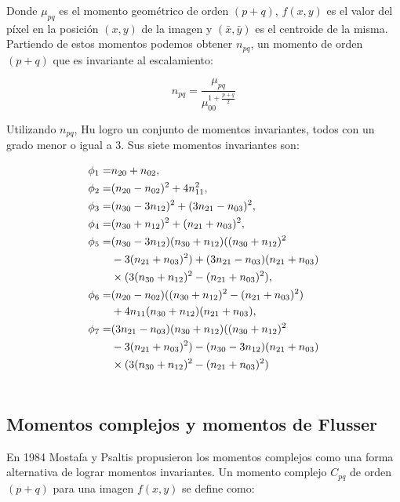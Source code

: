 \documentclass[a4paper, 11pt, oneside]{report}
\begin{document}
Donde $\mu_{pq}$ es el momento geométrico de orden $(p+q)$, $f(x,y)$ es el valor del píxel en la posición $(x,y)$ de la imagen y $(\bar{x},\bar{y})$ es el centroide de la misma. Partiendo de estos momentos podemos obtener $n_{pq}$, un momento de orden $(p+q)$ que es invariante al escalamiento:

	\begin{equation}\label{eq2}
		n_{pq} = \frac{\mu_{pq}}{ \mu_{00}^{1+\frac{p+q}{2}} }
	\end{equation}

Utilizando $n_{pq}$, Hu logro un conjunto de momentos invariantes, todos con un grado menor o igual a 3. Sus siete momentos invariantes son:

	\begin{align}
		\phi_1 =& n_{20} + n_{02}, \notag\\ 
		\phi_2 =& (n_{20} - n_{02})^{2} + 4n_{11}^{2}, \notag \\ 
		\phi_3 =& (n_{30} - 3n_{12})^{2} + (3n_{21} - n_{03})^{2}, \notag \\ 
		\phi_4 =& (n_{30} + n_{12})^{2} + (n_{21} + n_{03})^{2},\notag \\ 
		\phi_5 =& (n_{30} - 3n_{12})(n_{30} + n_{12})((n_{30} + n_{12})^{2} \notag \\
				& - 3(n_{21} + n_{03})^{2}) + (3n_{21} - n_{03})(n_{21} + n_{03})\notag\\ 
				& \times (3(n_{30} + n_{12})^{2} - (n_{21} + n_{03})^{2}),\notag\\ 
		\phi_6 =& (n_{20} - n_{02})((n_{30} + n_{12})^{2} - (n_{21} + n_{03})^{2})\notag\\
				& + 4n_{11}(n_{30} + n_{12})(n_{21} + n_{03}),\notag\\
		\phi_7 =& (3n_{21} - n_{03})(n_{30} + n_{12})((n_{30} + n_{12})^{2}\notag\\
				& - 3(n_{21} + n_{03})^{2}) - (n_{30} - 3n_{12})(n_{21} + n_{03}) \notag\\
				& \times (3(n_{30} + n_{12})^{2} - (n_{21} + n_{03})^{2}) \label{eq:huMom} \\ \notag
	\end{align}

\subsection{Momentos complejos y momentos de Flusser}

En 1984 Mostafa y Psaltis \cite{mostaf84} propusieron los momentos complejos como una forma alternativa de lograr momentos invariantes. Un momento complejo $C_{pq}$ de orden $(p+q)$ para una imagen $f(x,y)$ se define como:
\end{document}
